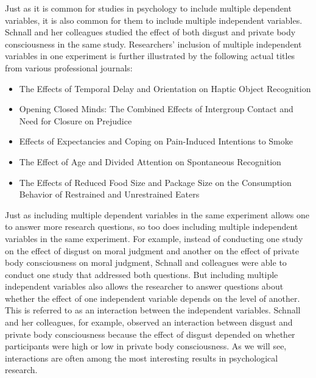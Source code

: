 
Just as it is common for studies in psychology to include multiple dependent variables, it is also common for them to include multiple independent variables. Schnall and her colleagues studied the effect of both disgust and private body consciousness in the same study. Researchers' inclusion of multiple independent variables in one experiment is further illustrated by the following actual titles from various professional journals:
\begin{itemize}
\item The Effects of Temporal Delay and Orientation on Haptic Object Recognition
\item Opening Closed Minds: The Combined Effects of Intergroup Contact and Need for Closure on Prejudice
\item Effects of Expectancies and Coping on Pain-Induced Intentions to Smoke
\item The Effect of Age and Divided Attention on Spontaneous Recognition
\item The Effects of Reduced Food Size and Package Size on the Consumption Behavior of Restrained and
Unrestrained Eaters
\end{itemize}

Just as including multiple dependent variables in the same experiment allows one to answer more research questions, so too does including multiple independent variables in the same experiment. For example, instead of conducting one study on the effect of disgust on moral judgment and another on the effect of private body consciousness on moral judgment, Schnall and colleagues were able to conduct one study that addressed both questions. But including multiple independent variables also allows the researcher to answer questions about whether the effect of one independent variable depends on the level of another. This is referred to as an interaction between the independent variables. Schnall and her colleagues, for example, observed an interaction between disgust and private body consciousness because the effect of disgust depended on whether participants were high or low in private body consciousness. As we will see, interactions are often among the most interesting results in psychological research.

